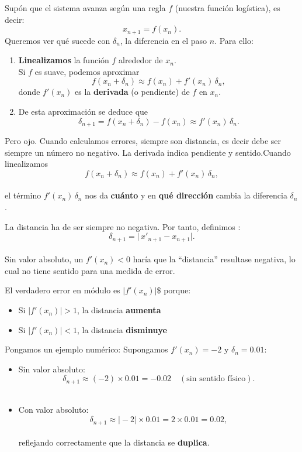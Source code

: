 \documentclass[
  10pt,
  a4paper,
  DIV=11,
  numbers=noendperiod,
  open=any]{scrreprt}
\providecommand{\tightlist}{%
  \setlength{\itemsep}{0pt}\setlength{\parskip}{0pt}}
\numberwithin{equation}{chapter}
\numberwithin{equation}{section}
\renewcommand{\[}{\begin{equation}}
\renewcommand{\]}{\end{equation}}
\begin{document}
Supón que el sistema avanza según una regla \(f\) (nuestra función
logística), es decir: \[
x_{n+1} = f(x_n).
\] Queremos ver qué sucede con \(\delta_n\), la diferencia en el paso
\(n\). Para ello:

\begin{enumerate}
\def\labelenumi{\arabic{enumi}.}
\item
  \textbf{Linealizamos} la función \(f\) alrededor de \(x_n\).\\
  Si \(f\) es suave, podemos aproximar \[
    f(x_n + \delta_n)
    \approx f(x_n)
         + f'(x_n)\,\delta_n,
  \] donde \(f'(x_n)\) es la \textbf{derivada} (o pendiente) de \(f\) en
  \(x_n\).
\item
  De esta aproximación se deduce que \[
    \delta_{n+1} 
    = f(x_n + \delta_n) - f(x_n)
    \approx f'(x_n)\,\delta_n.
  \]
\end{enumerate}

Pero ojo. Cuando calculamos errores, siempre son distancia, es decir
debe ser siempre un número no negativo. La derivada indica pendiente y
sentido.Cuando linealizamos\\
\[
   f(x_n + \delta_n)\approx f(x_n) + f'(x_n)\,\delta_n,
   \]\\
el término \(f'(x_n)\,\delta_n\) nos da \textbf{cuánto} y en \textbf{qué
dirección} cambia la diferencia \(\delta_n\).

La distancia ha de ser siempre no negativa. Por tanto, definimos : \[
   \delta_{n+1} = \bigl|\,x'_{n+1} - x_{n+1}\bigr|.
   \]\\
Sin valor absoluto, un \(f'(x_n)<0\) haría que la ``distancia''
resultase negativa, lo cual no tiene sentido para una medida de error.

El verdadero error en módulo es \(\bigl|f'(x_n)\bigr|\)\$ porque:

\begin{itemize}
\tightlist
\item
  Si \(\lvert f'(x_n)\rvert>1\), la distancia \textbf{aumenta}\\
\item
  Si \(\lvert f'(x_n)\rvert<1\), la distancia \textbf{disminuye}
\end{itemize}

Pongamos un ejemplo numérico: Supongamos \(f'(x_n)=-2\) y
\(\delta_n=0.01\):

\begin{itemize}
\tightlist
\item
  Sin valor absoluto:\\
  \[
  \delta_{n+1}\approx(-2)\times0.01=-0.02\quad(\text{sin sentido físico}).
  \]\\
\item
  Con valor absoluto:\\
  \[
  \delta_{n+1}\approx\bigl|-2\bigr|\times0.01=2\times0.01=0.02,
  \]\\
  reflejando correctamente que la distancia se \textbf{duplica}.
\end{itemize}
\end{document}
